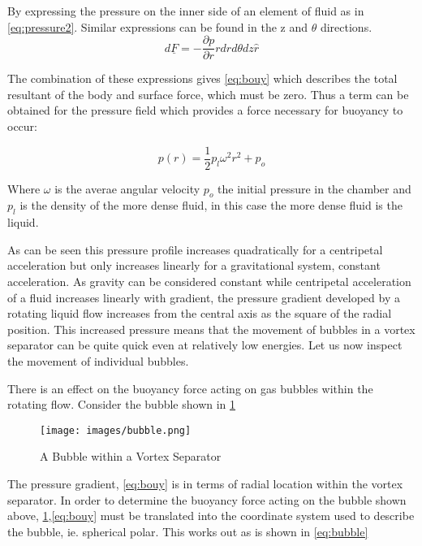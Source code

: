 \documentclass[12pt]{article}
\begin{document}
By expressing the pressure on the inner side of an element of fluid as in \cref{eq:pressure2}. Similar expressions can be found in the z and $\theta$ directions.
\begin{equation}
d\underline{F}=-\frac{\partial p}{\partial r}r drd\theta{}dz\hat{r}
\label{eq:surface_force}
\end{equation}

The combination of these expressions gives \cref{eq:bouy} which describes the total resultant of the body and surface force, which must be zero. Thus a term can be obtained for the pressure field which provides a force necessary for buoyancy to occur:

\begin{equation}
p(r)=\frac{1}{2}p_l \omega^2 r^2 + p_o
\label{eq:bouy}
\end{equation}

Where $\omega$ is the averae angular velocity $p_o$ the initial pressure in the chamber and $p_l$ is the density of the more dense fluid, in this case the more dense fluid is the liquid.

As can be seen this pressure profile increases quadratically for a centripetal acceleration but only increases linearly for a gravitational system, constant acceleration. As gravity can be considered constant while centripetal acceleration of a fluid increases linearly with gradient, the pressure gradient developed by a rotating liquid flow increases from the central axis as the square of the radial position. This increased pressure means that the movement of bubbles in a vortex separator can be quite quick even at relatively low energies. Let us now inspect the movement of individual bubbles.

There is an effect on the buoyancy force acting on gas bubbles within the rotating flow. Consider the bubble shown in \cref{fig:bubble}

\begin{figure}[ht]
\centering
\texttt{[image: images/bubble.png]}
\caption{A Bubble within a Vortex Separator}
\label{fig:bubble}
\end{figure}

The pressure gradient, \cref{eq:bouy} is in terms of radial location within the vortex separator. In order to determine the buoyancy force acting on the bubble shown above, \cref{fig:bubble},\cref{eq:bouy} must be translated into the coordinate system used to describe the bubble, ie. spherical polar. This works out as is shown in \cref{eq:bubble}
\end{document}
